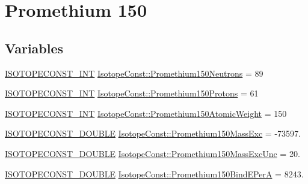 \hypertarget{group___isotope_const-_promethium-_pm150}{}\section{Promethium 150}
\label{group___isotope_const-_promethium-_pm150}
\subsection*{Variables}
\begin{DoxyCompactItemize}
\item 
\mbox{\hyperlink{group___isotope_const-_macros_ga5f18360b3e99483a35c32d789e62621c}{I\+S\+O\+T\+O\+P\+E\+C\+O\+N\+S\+T\+\_\+\+I\+NT}} \mbox{\hyperlink{group___isotope_const-_promethium-_pm150_ga4273f8229acd8388783606124ed36368}{Isotope\+Const\+::\+Promethium150\+Neutrons}} = 89
\item 
\mbox{\hyperlink{group___isotope_const-_macros_ga5f18360b3e99483a35c32d789e62621c}{I\+S\+O\+T\+O\+P\+E\+C\+O\+N\+S\+T\+\_\+\+I\+NT}} \mbox{\hyperlink{group___isotope_const-_promethium-_pm150_gafb2e4a67415188d40fc24b26c4e8c728}{Isotope\+Const\+::\+Promethium150\+Protons}} = 61
\item 
\mbox{\hyperlink{group___isotope_const-_macros_ga5f18360b3e99483a35c32d789e62621c}{I\+S\+O\+T\+O\+P\+E\+C\+O\+N\+S\+T\+\_\+\+I\+NT}} \mbox{\hyperlink{group___isotope_const-_promethium-_pm150_ga73447f98481ac7341eb7dbde6d367546}{Isotope\+Const\+::\+Promethium150\+Atomic\+Weight}} = 150
\item 
\mbox{\hyperlink{group___isotope_const-_macros_ga8f45a7272ce02c0b4c65c44636ed719a}{I\+S\+O\+T\+O\+P\+E\+C\+O\+N\+S\+T\+\_\+\+D\+O\+U\+B\+LE}} \mbox{\hyperlink{group___isotope_const-_promethium-_pm150_gad1326b44bf02fb159929fb975e2c2fdd}{Isotope\+Const\+::\+Promethium150\+Mass\+Exc}} = -\/73597.
\item 
\mbox{\hyperlink{group___isotope_const-_macros_ga8f45a7272ce02c0b4c65c44636ed719a}{I\+S\+O\+T\+O\+P\+E\+C\+O\+N\+S\+T\+\_\+\+D\+O\+U\+B\+LE}} \mbox{\hyperlink{group___isotope_const-_promethium-_pm150_ga40edf4d8470b83807b66ebb37bbfb382}{Isotope\+Const\+::\+Promethium150\+Mass\+Exc\+Unc}} = 20.
\item 
\mbox{\hyperlink{group___isotope_const-_macros_ga8f45a7272ce02c0b4c65c44636ed719a}{I\+S\+O\+T\+O\+P\+E\+C\+O\+N\+S\+T\+\_\+\+D\+O\+U\+B\+LE}} \mbox{\hyperlink{group___isotope_const-_promethium-_pm150_ga6bd91a5b4c8ee5e5fcd71c9db4fd4462}{Isotope\+Const\+::\+Promethium150\+Bind\+E\+PerA}} = 8243.

\end{DoxyCompactItemize}
